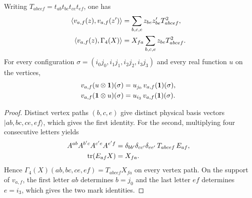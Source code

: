 \begin{lemma}
    \label{thm:weighted-matrix-unit-path-contractions}
    \leanok
    Writing $T_{abcef}=t_{ab}t_{bc}t_{ce}t_{ef}$, one has
    \begin{align}
        \langle v_{a,f}(z),v_{a,f}(z')\rangle
         & =\sum_{b,c,e}z_{be}z'_{be}T_{abcef}^{2}, \notag \\
        \langle v_{a,f}(z),\Gamma_4(X)\rangle
         & =X_{fa}\sum_{b,c,e}z_{be}T_{abcef}^{2}. \notag
    \end{align}
    For every configuration $\sigma=(i_0j_0,i_1j_1,i_2j_2,i_3j_3)$ and every
    real function $u$ on the vertices,
    \begin{align}
        v_{a,f}(u\otimes\mathbf 1)(\sigma)
         & =u_{j_0}\,v_{a,f}(\mathbf 1)(\sigma), \notag \\
        v_{a,f}(\mathbf 1\otimes u)(\sigma)
         & =u_{i_3}\,v_{a,f}(\mathbf 1)(\sigma). \notag
    \end{align}
\end{lemma}
\begin{proof}\leanok
    Distinct vertex paths $(b,c,e)$ give distinct physical basis vectors
    $|ab,bc,ce,ef\rangle$, which gives the first identity. For the second,
    multiplying four consecutive letters yields
    \begin{align}
        A^{ab}A^{b'c}A^{c'e}A^{e'f}
         & =\delta_{bb'}\delta_{cc'}\delta_{ee'}\,T_{abcef}\,E_{af}, \notag \\
        \operatorname{tr}(E_{af}X)
         & =X_{fa}. \notag
    \end{align}
    Hence $\Gamma_4(X)(ab,bc,ce,ef)=T_{abcef}X_{fa}$ on every vertex path.
    On the support of $v_{a,f}$, the first letter $ab$ determines $b=j_0$ and
    the last letter $ef$ determines $e=i_3$, which gives the two mark
    identities.
\end{proof}

